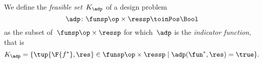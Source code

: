 



\begin{comment}
    \todotext{not sure we need example here anyway}
    \begin{example}
        Imagine a truck to be driving at constant speed on a straight street.
        If it can cover \unit[100]{km} with \unit[10]{L} of gasoline, it can also cover \unit[80]{km} with it.
        Furthermore, it will be able to cover the \unit[100]{km} also with \unit[10]{L} of gasoline.
    \end{example}

%
\end{comment}


\begin{definition}
    \label{def:dp-feasible-set}
    We define the \emph{feasible set}~$K_\adp$ of a design problem~
    \begin{equation}
        \label{eq:generic-design-prob}
        \adp\colon \funsp\op \times \ressp\toinPos \Bool
    \end{equation}
    as the subset of~$\funsp \op\times \ressp$ for which~$\adp$ is the \emph{indicator function}, that is%
    \begin{equation}
        \label{eq:design-prob-as-upper-set}
        K_\adp = \{ \tup{\F{f^*},\res} \in \funsp \op\times \ressp  \mid %
        \adp(\fun^*, \res) = \true %
        \}.
    \end{equation}
\end{definition}


